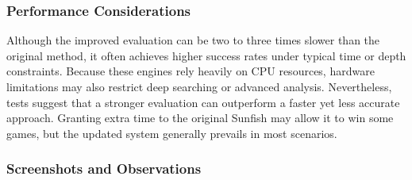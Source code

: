 \documentclass[12pt,a4paper]{article}
\begin{document}
\subsubsection{Performance Considerations}

Although the improved evaluation can be two to three times slower than the original method, it often achieves higher success rates under typical time or depth constraints. Because these engines rely heavily on CPU resources, hardware limitations may also restrict deep searching or advanced analysis. Nevertheless, tests suggest that a stronger evaluation can outperform a faster yet less accurate approach. Granting extra time to the original Sunfish may allow it to win some games, but the updated system generally prevails in most scenarios.

\subsubsection{Screenshots and Observations}
\end{document}
